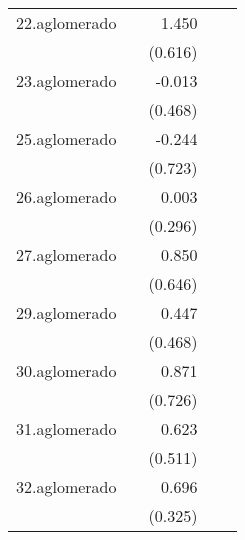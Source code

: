 {\begin{longtable}{l*{4}{D{.}{.}{-1}}}
\addlinespace
22.aglomerado&                     &       1.450\sym{*}  &                     &                     \\
            &                     &     (0.616)         &                     &                     \\
\addlinespace
23.aglomerado&                     &      -0.013         &                     &                     \\
            &                     &     (0.468)         &                     &                     \\
\addlinespace
25.aglomerado&                     &      -0.244         &                     &                     \\
            &                     &     (0.723)         &                     &                     \\
\addlinespace
26.aglomerado&                     &       0.003         &                     &                     \\
            &                     &     (0.296)         &                     &                     \\
\addlinespace
27.aglomerado&                     &       0.850         &                     &                     \\
            &                     &     (0.646)         &                     &                     \\
\addlinespace
29.aglomerado&                     &       0.447         &                     &                     \\
            &                     &     (0.468)         &                     &                     \\
\addlinespace
30.aglomerado&                     &       0.871         &                     &                     \\
            &                     &     (0.726)         &                     &                     \\
\addlinespace
31.aglomerado&                     &       0.623         &                     &                     \\
            &                     &     (0.511)         &                     &                     \\
\addlinespace
32.aglomerado&                     &       0.696\sym{*}  &                     &                     \\
            &                     &     (0.325)         &                     &                     \\

\end{longtable}}
